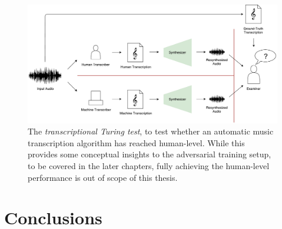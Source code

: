 \begin{figure}
	\includegraphics[width=\textwidth]{turing.pdf}
	\caption{The \emph{transcriptional Turing test}, to test whether an automatic music transcription algorithm has reached human-level. While this provides some conceptual insights to the adversarial training setup, to be covered in the later chapters, fully achieving the human-level performance is out of scope of this thesis.}
	\label{fig:turing}
\end{figure}

\section{Conclusions}

\pagebreak